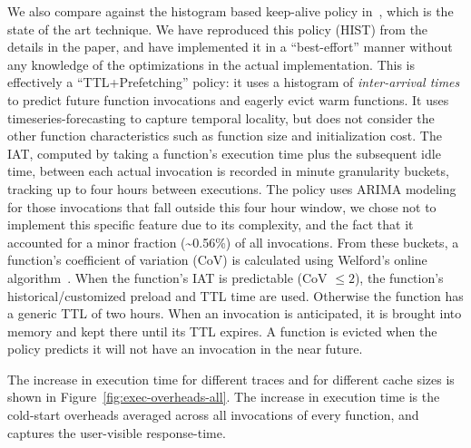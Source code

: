 We also compare against the histogram based keep-alive policy in~\cite{shahrad_serverless_2020}, which is the state of the art technique.
We have reproduced this policy (HIST) from the details in the paper, and have implemented it in a ``best-effort'' manner without any knowledge of the optimizations in the actual implementation.
This is effectively a ``TTL+Prefetching'' policy: it uses a histogram of \emph{inter-arrival times} to predict future function invocations and eagerly evict warm functions.
It uses timeseries-forecasting to capture temporal locality, but does not consider the other function characteristics such as function size and initialization cost. 
The IAT, computed by taking a function's execution time plus the subsequent idle time, between each actual invocation is recorded in minute granularity buckets, tracking up to four hours between executions.
The policy uses ARIMA modeling for those invocations that fall outside this four hour window, we chose not to implement this specific feature due to its complexity, and the fact that it accounted for a minor fraction (\textasciitilde 0.56\%) of all invocations.
From these buckets, a function's coefficient of variation (CoV) is calculated using Welford's online algorithm~\cite{welford}. 
When the function's IAT is predictable (CoV $\leq 2$), the function's historical/customized preload and TTL time are used. Otherwise the function has a generic TTL of two hours. 
When an invocation is anticipated, it is brought into memory and kept there until its TTL expires.
A function is evicted when the policy predicts it will not have an invocation in the near future. 


%
The increase in execution time for different traces and for different cache sizes is shown in Figure~\ref{fig:exec-overheads-all}.
The increase in execution time is the cold-start overheads averaged across all invocations of every function, and captures the user-visible response-time. 
%

